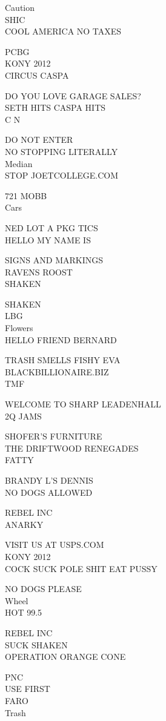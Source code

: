 \documentclass[10pt,letterpaper]{article}
\begin{document}
Caution\\
SHIC\\
COOL AMERICA NO TAXES

PCBG\\
KONY 2012\\
CIRCUS CASPA

DO YOU LOVE GARAGE SALES?\\
SETH HITS CASPA HITS\\
C N

DO NOT ENTER\\
NO STOPPING LITERALLY\\
Median\\
STOP JOETCOLLEGE.COM

721 MOBB\\
Cars

NED LOT A PKG TICS\\
HELLO MY NAME IS

SIGNS AND MARKINGS\\
RAVENS ROOST\\
SHAKEN

SHAKEN\\
LBG\\
Flowers\\
HELLO FRIEND BERNARD

TRASH SMELLS FISHY EVA\\
BLACKBILLIONAIRE.BIZ\\
TMF

WELCOME TO SHARP LEADENHALL\\
2Q JAMS

SHOFER'S FURNITURE\\
THE DRIFTWOOD RENEGADES\\
FATTY

BRANDY L'S DENNIS\\
NO DOGS ALLOWED

REBEL INC\\
ANARKY

VISIT US AT USPS.COM\\
KONY 2012\\
COCK SUCK POLE SHIT EAT PUSSY

NO DOGS PLEASE\\
Wheel\\
HOT 99.5

REBEL INC\\
SUCK SHAKEN\\
OPERATION ORANGE CONE

PNC\\
USE FIRST\\
FARO\\
Trash
\end{document}
